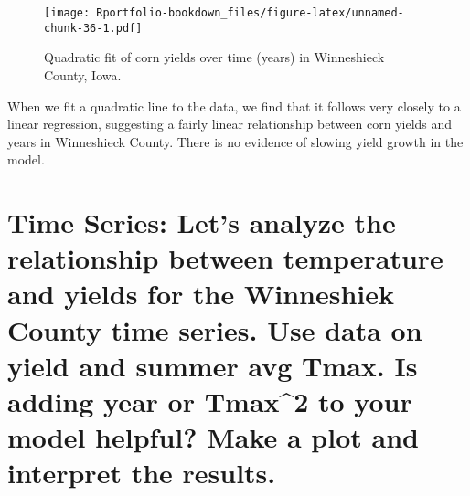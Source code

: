 \documentclass[
]{book}
\newenvironment{Shaded}{\begin{snugshade}}{\end{snugshade}}
\newcommand{\AttributeTok}[1]{\textcolor[rgb]{0.77,0.63,0.00}{#1}}
\newcommand{\CommentTok}[1]{\textcolor[rgb]{0.56,0.35,0.01}{\textit{#1}}}
\newcommand{\DecValTok}[1]{\textcolor[rgb]{0.00,0.00,0.81}{#1}}
\newcommand{\FunctionTok}[1]{\textcolor[rgb]{0.00,0.00,0.00}{#1}}
\newcommand{\NormalTok}[1]{#1}
\newcommand{\OtherTok}[1]{\textcolor[rgb]{0.56,0.35,0.01}{#1}}
\newcommand{\SpecialCharTok}[1]{\textcolor[rgb]{0.00,0.00,0.00}{#1}}
\begin{document}
\begin{figure}
\centering
\texttt{[image: Rportfolio-bookdown\_files/figure-latex/unnamed-chunk-36-1.pdf]}
\caption{\label{fig:unnamed-chunk-36}Quadratic fit of corn yields over time (years) in Winneshieck County, Iowa.}
\end{figure}

When we fit a quadratic line to the data, we find that it follows very closely to a linear regression, suggesting a fairly linear relationship between corn yields and years in Winneshieck County. There is no evidence of slowing yield growth in the model.

\hypertarget{time-series-lets-analyze-the-relationship-between-temperature-and-yields-for-the-winneshiek-county-time-series.-use-data-on-yield-and-summer-avg-tmax.-is-adding-year-or-tmax2-to-your-model-helpful-make-a-plot-and-interpret-the-results.}{%
\section{Time Series: Let's analyze the relationship between temperature and yields for the Winneshiek County time series. Use data on yield and summer avg Tmax. Is adding year or Tmax\^{}2 to your model helpful? Make a plot and interpret the results.}\label{time-series-lets-analyze-the-relationship-between-temperature-and-yields-for-the-winneshiek-county-time-series.-use-data-on-yield-and-summer-avg-tmax.-is-adding-year-or-tmax2-to-your-model-helpful-make-a-plot-and-interpret-the-results.}}

\begin{Shaded}
\end{Shaded}
\end{document}
